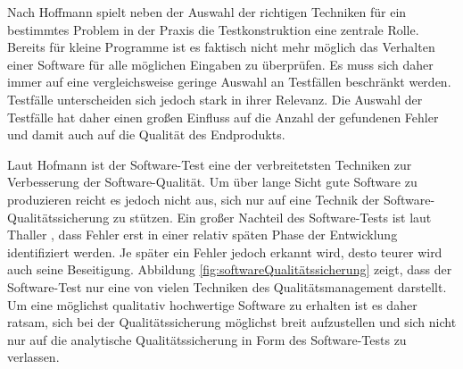Nach Hoffmann \cite[vgl. S.22]{hoffmann_software-qualitat_2013} spielt neben der Auswahl der richtigen Techniken für ein bestimmtes Problem in der Praxis die Testkonstruktion eine zentrale Rolle. Bereits für kleine Programme ist es faktisch nicht mehr möglich das Verhalten einer Software für alle möglichen Eingaben zu überprüfen. Es muss sich daher immer auf eine vergleichsweise geringe Auswahl an Testfällen beschränkt werden. Testfälle unterscheiden sich jedoch stark in ihrer Relevanz. Die Auswahl der Testfälle hat daher einen großen Einfluss auf die Anzahl der gefundenen Fehler und damit auch auf die Qualität des Endprodukts. 

Laut Hofmann \cite[vgl. S.22]{hoffmann_software-qualitat_2013} ist der Software-Test eine der verbreitetsten Techniken zur Verbesserung der Software-Qualität. Um über lange Sicht gute Software zu produzieren reicht es jedoch nicht aus, sich nur auf eine Technik der Software-Qualitätssicherung zu stützen. Ein großer Nachteil des Software-Tests ist laut Thaller \cite[vgl. S.18]{thaller_software-test_2002}, dass Fehler erst in einer relativ späten Phase der Entwicklung identifiziert werden. Je später ein Fehler jedoch erkannt wird, desto teurer wird auch seine Beseitigung. Abbildung \ref{fig:softwareQualitätssicherung} zeigt, dass der Software-Test nur eine von vielen Techniken des Qualitätsmanagement darstellt. Um eine möglichst qualitativ hochwertige Software zu erhalten ist es daher ratsam, sich bei der Qualitätssicherung möglichst breit aufzustellen und sich nicht nur auf die analytische Qualitätssicherung in Form des Software-Tests zu verlassen. 


